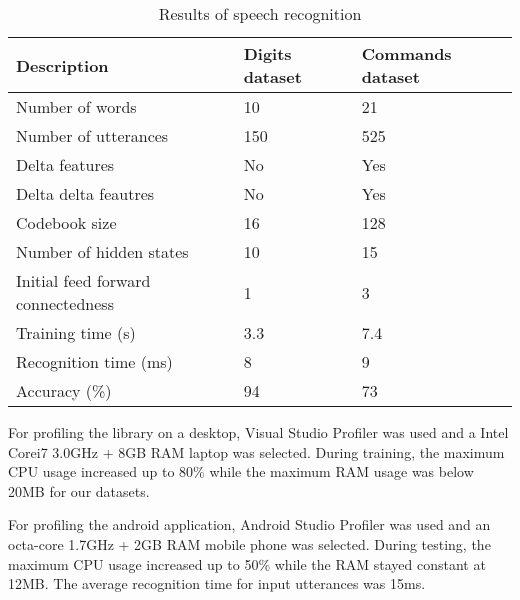 \begin{table}[H]
    \centering
    \begin{tabular}{lll}
    \hline
    Description           & Digits dataset & Commands dataset \\
    \hline
    Number of words       &  10     & 21 \\
    Number of utterances  &  150    & 525 \\
    \hline
    Delta features        &  No     & Yes \\
    Delta delta feautres  &  No     & Yes \\
    Codebook size         &  16  & 128 \\
    Number of hidden states  &  10 & 15 \\
    Initial feed forward connectedness &  1 & 3 \\
    \hline
    Training time (s)     &  3.3 & 7.4 \\
    Recognition time (ms) &  8  & 9 \\
    Accuracy (\%)         &  94 & 73 \\
    \hline
    \end{tabular}
    \caption{Results of speech recognition}
\end{table}   

For profiling the library on a desktop, Visual Studio Profiler was used and a Intel Corei7 3.0GHz + 8GB RAM laptop was selected. During training, the maximum CPU usage increased up to 80\% while the maximum RAM usage was below 20MB for our datasets.

For profiling the android application, Android Studio Profiler was used and an octa-core 1.7GHz + 2GB RAM mobile phone was selected. During testing, the maximum CPU usage increased up to 50\% while the RAM stayed constant at 12MB. The average recognition time for input utterances was 15ms.